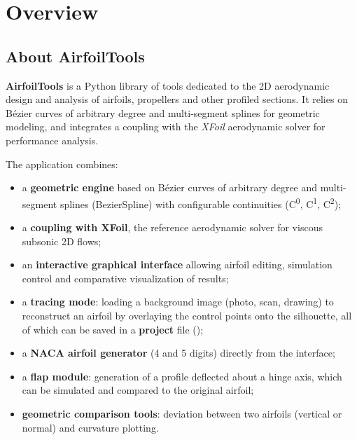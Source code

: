 \chapter{Overview}
\label{chap:introduction}

\section{About AirfoilTools}

\textbf{AirfoilTools} is a Python library of tools dedicated
to the 2D aerodynamic design and analysis of airfoils, propellers and other profiled sections.
It relies on Bézier curves of arbitrary degree and
multi-segment splines for geometric modeling, and integrates a coupling with the \emph{XFoil} aerodynamic solver
for performance analysis.

The application combines:

\begin{itemize}
    \item a \textbf{geometric engine} based on Bézier
        curves of arbitrary degree and multi-segment splines
        (BezierSpline) with configurable continuities (C\textsuperscript{0},
        C\textsuperscript{1}, C\textsuperscript{2});
    \item a \textbf{coupling with XFoil}, the reference
        aerodynamic solver for viscous subsonic 2D
        flows;
    \item an \textbf{interactive graphical interface} allowing
        airfoil editing, simulation control and
        comparative visualization of results;
    \item a \textbf{tracing mode}: loading a background image
        (photo, scan, drawing) to reconstruct an airfoil
        by overlaying the control points onto the silhouette, all
        of which can be saved in a \textbf{project} file
        ();
    \item a \textbf{NACA airfoil generator} (4 and 5 digits)
        directly from the interface;
    \item a \textbf{flap module}: generation of a profile
        deflected about a hinge axis, which can be simulated and compared
        to the original airfoil;
    \item \textbf{geometric comparison tools}: deviation
        between two airfoils (vertical or normal) and curvature
        plotting.
\end{itemize}


